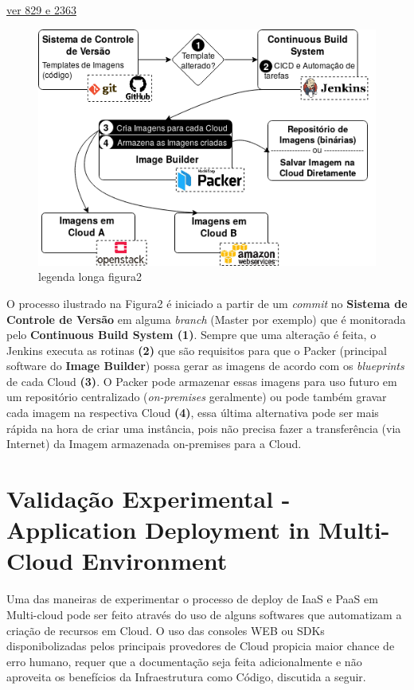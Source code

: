 \documentclass[12pt]{article}
\begin{document}
	\underline{ver 829 e 2363}
	
		\begin{figure}[H]
			\centering
			\includegraphics[width=0.7\linewidth]{figuras/Figure2.png}
			\caption{legenda longa figura2}
			\label{fig:figure2}
		\end{figure}
	
	O processo ilustrado na Figura2 é iniciado a partir de um \textit{commit} no \textbf{Sistema de Controle de Versão} em alguma \textit{branch} (Master por exemplo) que é monitorada pelo \textbf{Continuous Build System (1)}. Sempre que uma alteração é feita, o Jenkins executa as rotinas \textbf{(2)} que são requisitos para que o Packer (principal software do \textbf{Image Builder}) possa gerar as imagens de acordo com os \textit{blueprints} de cada Cloud \textbf{(3)}. O Packer pode armazenar essas imagens para uso futuro em um repositório centralizado (\textit{on-premises} geralmente) ou pode também gravar cada imagem na respectiva Cloud \textbf{(4)}, essa última alternativa pode ser mais rápida na hora de criar uma instância, pois não precisa fazer a transferência (via Internet) da Imagem armazenada on-premises para a Cloud.
	
	\section{Validação Experimental - Application Deployment in Multi-Cloud Environment}
	
	Uma das maneiras de experimentar o processo de deploy de IaaS e PaaS em Multi-cloud pode ser feito através do uso de alguns softwares que automatizam a criação de recursos em Cloud. O uso das consoles WEB ou SDKs disponibolizadas pelos principais provedores de Cloud propicia maior chance de erro humano, requer que a documentação seja feita adicionalmente e não aproveita os benefícios da Infraestrutura como Código, discutida a seguir.  
	
\end{document}

